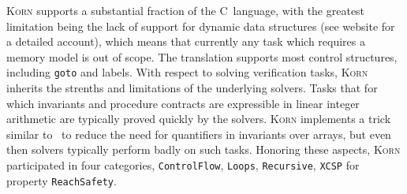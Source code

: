 \documentclass{llncs}
\newcommand{\Korn}{\textsc{Korn}\xspace}
\begin{document}
\Korn supports a substantial fraction of the C~language, with the greatest limitation
being the lack of support for dynamic data structures (see website for a detailed account),
which means that currently any task which requires a memory model is out of scope.
The translation supports most control structures, including \texttt{goto} and labels.
With respect to solving verification tasks,
\Korn inherits the strenths and limitations of the underlying solvers.
Tasks that for which invariants and procedure contracts are expressible in linear integer arithmetic
are typically proved quickly by the solvers.
\Korn implements a trick similar to~\cite{monniaux2016cell}
to reduce the need for quantifiers in invariants over arrays,
but even then solvers typically perform badly on such tasks.
Honoring these aspects, \Korn participated in four categories,
\texttt{ControlFlow},
\texttt{Loops},
\texttt{Recursive},
\texttt{XCSP}
for property \texttt{ReachSafety}.
\end{document}
